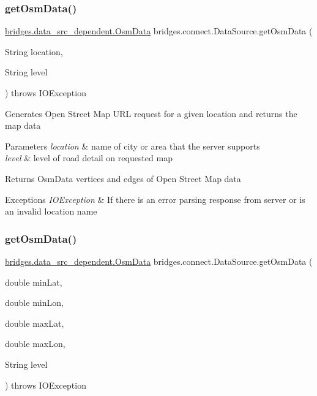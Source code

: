 \subsubsection{\texorpdfstring{getOsmData()}{getOsmData()}\hspace{0.1cm}{\footnotesize\ttfamily [1/2]}}
{\footnotesize\ttfamily \mbox{\hyperlink{classbridges_1_1data__src__dependent_1_1_osm_data}{bridges.\+data\+\_\+src\+\_\+dependent.\+Osm\+Data}} bridges.\+connect.\+Data\+Source.\+get\+Osm\+Data (\begin{DoxyParamCaption}\item[{String}]{location,  }\item[{String}]{level }\end{DoxyParamCaption}) throws I\+O\+Exception}

Generates Open Street Map U\+RL request for a given location and returns the map data 
\begin{DoxyParams}{Parameters}
{\em location} & name of city or area that the server supports \\
\hline
{\em level} & level of road detail on requested map \\
\hline
\end{DoxyParams}
\begin{DoxyReturn}{Returns}
Osm\+Data vertices and edges of Open Street Map data 
\end{DoxyReturn}

\begin{DoxyExceptions}{Exceptions}
{\em I\+O\+Exception} & If there is an error parsing response from server or is an invalid location name \\
\hline
\end{DoxyExceptions}
\mbox{\label{classbridges_1_1connect_1_1_data_source_af68a95ea0608f5bcf0be9e336f748d76}} 
\subsubsection{\texorpdfstring{getOsmData()}{getOsmData()}\hspace{0.1cm}{\footnotesize\ttfamily [2/2]}}
{\footnotesize\ttfamily \mbox{\hyperlink{classbridges_1_1data__src__dependent_1_1_osm_data}{bridges.\+data\+\_\+src\+\_\+dependent.\+Osm\+Data}} bridges.\+connect.\+Data\+Source.\+get\+Osm\+Data (\begin{DoxyParamCaption}\item[{double}]{min\+Lat,  }\item[{double}]{min\+Lon,  }\item[{double}]{max\+Lat,  }\item[{double}]{max\+Lon,  }\item[{String}]{level }\end{DoxyParamCaption}) throws I\+O\+Exception}


